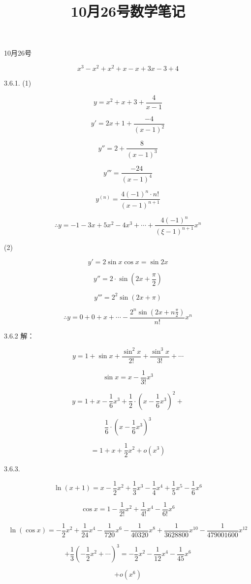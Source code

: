 \documentclass[UTF8,fontset=windows]{ctexart}
\title{10月26号数学笔记}
\begin{document}
\maketitle
10月26号

\[
x^3 - x^2 + x^2 + x - x + 3x - 3 + 4
\]

3.6.1. (1)

\[
y = x^2 + x + 3 + \frac{4}{x-1}
\]

\[
y' = 2x + 1 + \frac{-4}{(x-1)^2}
\]

\[
y'' = 2 + \frac{8}{(x-1)^3}
\]

\[
y''' = \frac{-24}{(x-1)^4}
\]

\[
y^{(n)} = \frac{4(-1)^n \cdot n!}{(x-1)^{n+1}}
\]

\[
\therefore y = -1 - 3x + 5x^2 - 4x^3 + \cdots + \frac{4(-1)^n}{(\xi-1)^{n+1}}x^n
\]

(2)

\[
y' = 2\sin x\cos x = \sin 2x
\]

\[
y'' = 2 \cdot \sin\left(2x + \frac{\pi}{2}\right)
\]

\[
y''' = 2^2 \sin(2x + \pi)
\]

\[
\therefore y = 0 + 0 + x + \cdots - \frac{2^n \sin\left(2x + n\frac{\pi}{2}\right)}{n!}x^n
\]

3.6.2 解：

\[
y = 1 + \sin x + \frac{\sin^2 x}{2!} + \frac{\sin^3 x}{3!} + \cdots
\]

\[
\sin x = x - \frac{1}{3!}x^3
\]

\[
y = 1 + x - \frac{1}{6}x^3 + \frac{1}{2}\cdot \left(x - \frac{1}{6}x^3\right)^2 +
\]

\[
\frac{1}{6}\cdot \left(x - \frac{1}{6}x^3\right)^3
\]

\[
= 1 + x + \frac{1}{2}x^2 + o(x^3)
\]

3.6.3.

\[
\ln(x+1) = x - \frac{1}{2}x^2 + \frac{1}{3}x^3 - \frac{1}{4}x^4 + \frac{1}{5}x^5 - \frac{1}{6}x^6
\]

\[
\cos x = 1 - \frac{1}{2!}x^2 + \frac{1}{4!}x^4 - \frac{1}{6!}x^6
\]

\newpage

\[
\ln(\cos x)=-\frac{1}{2}x^{2}+\frac{1}{24}x^{4}-\frac{1}{720}x^{6}-\frac{1}{40320}x^{8}+\frac{1}{3628800}x^{10}-\frac{1}{479001600}x^{12}
\]

\[
+\frac{1}{3}\left(-\frac{1}{2}x^{2}+\cdots\right)^{3}=-\frac{1}{2}x^{2}-\frac{1}{12}x^{4}-\frac{1}{45}x^{6}
\]

\[
+o(x^{6})
\]
\end{document}
